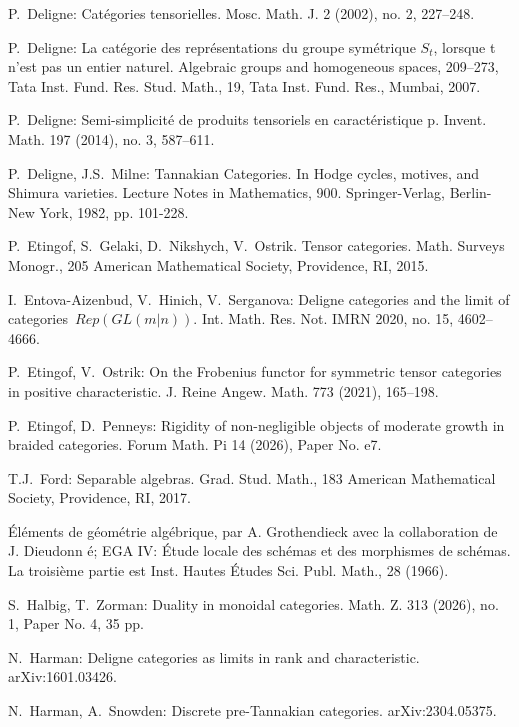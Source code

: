 \documentclass[11pt]{amsart}
\theoremstyle{definition}
\theoremstyle{remark}
\numberwithin{equation}{section}
\begin{document}
\begin{thebibliography}
	 P.~Deligne: Cat\'egories tensorielles. Mosc. Math. J. 2 (2002), no. 2, 227--248.

    	 P.~Deligne:
La cat\'egorie des repr\'esentations du groupe sym\'etrique $S_t$, lorsque t n'est pas un entier naturel. Algebraic groups and homogeneous spaces, 209--273,
Tata Inst. Fund. Res. Stud. Math., 19, Tata Inst. Fund. Res., Mumbai, 2007.

P.~Deligne: Semi-simplicit\'e de produits tensoriels en caract\'eristique p. Invent. Math. 197 (2014), no. 3, 587--611.

     P.~Deligne, J.S.~Milne: Tannakian Categories. In
Hodge cycles, motives, and Shimura varieties. 
Lecture Notes in Mathematics, 900. Springer-Verlag, Berlin-New York, 1982, pp. 101-228.

     P.~Etingof, S.~Gelaki, D.~Nikshych, V.~Ostrik.
Tensor categories.
Math. Surveys Monogr., 205
American Mathematical Society, Providence, RI, 2015. 

I.~Entova-Aizenbud, V.~Hinich, V.~Serganova:
Deligne categories and the limit of categories~$Rep(GL(m|n))$.
 Int. Math. Res. Not. IMRN 2020, no. 15, 4602--4666.


 P.~Etingof, V.~Ostrik: On the Frobenius functor for symmetric tensor categories in positive characteristic. J. Reine Angew. Math. 773 (2021), 165--198.

 P.~Etingof, D.~Penneys:
Rigidity of non-negligible objects of moderate growth in braided categories.
Forum Math. Pi 14 (2026), Paper No. e7.


 T.J.~Ford:
Separable algebras.
Grad. Stud. Math., 183
American Mathematical Society, Providence, RI, 2017.


 Éléments de géométrie algébrique, par A. Grothendieck avec la collaboration de J. Dieudonn
é; EGA IV: Étude locale des schémas et des morphismes de schémas. La troisième
partie est Inst. Hautes Études Sci. Publ. Math., 28 (1966).


 S.~Halbig, T.~Zorman:
Duality in monoidal categories.
Math. Z. 313 (2026), no. 1, Paper No. 4, 35 pp.

 N.~Harman: Deligne categories as limits in rank and characteristic. arXiv:1601.03426.

 N.~Harman, A.~Snowden: Discrete pre-Tannakian categories. arXiv:2304.05375.


\end{thebibliography}
\end{document}
